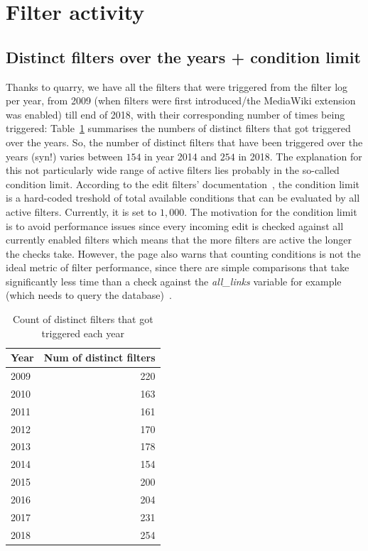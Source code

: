 \section{Filter activity}

\subsection{Distinct filters over the years + condition limit}
Thanks to quarry, we have all the filters that were triggered from the filter log per year, %
from 2009 (when filters were first introduced/the MediaWiki extension was enabled) till end of 2018, with their corresponding number of times being triggered:
Table~\ref{tab:active-filters-count} summarises the numbers of distinct filters that got triggered over the years.
So, the number of distinct filters that have been triggered over the years (syn!) varies between $154$ in year 2014 and $254$ in 2018.
The explanation for this not particularly wide range of active filters lies probably in the so-called condition limit.
According to the edit filters' documentation~\cite{Wikipedia:EditFilterDocumentation}, the condition limit is a hard-coded treshold of total available conditions that can be evaluated by all active filters.
Currently, it is set to $1,000$.
The motivation for the condition limit is to avoid performance issues since every incoming edit is checked against all currently enabled filters which means that the more filters are active the longer the checks take.
However, the page also warns that counting conditions is not the ideal metric of filter performance, since there are simple comparisons that take significantly less time than a check against the \emph{all\_links} variable for example (which needs to query the database)~\cite{Wikipedia:EditFilterDocumentation}.

\begin{table}
  \centering
  \begin{tabular}{l r }
    Year & Num of distinct filters \\
    \hline
    2009 & 220 \\
    2010 & 163 \\
    2011 & 161 \\
    2012 & 170 \\
    2013 & 178 \\
    2014 & 154 \\
    2015 & 200 \\
    2016 & 204 \\
    2017 & 231 \\
    2018 & 254 \\
  \end{tabular}
  \caption{Count of distinct filters that got triggered each year}~\label{tab:active-filters-count}
\end{table}

